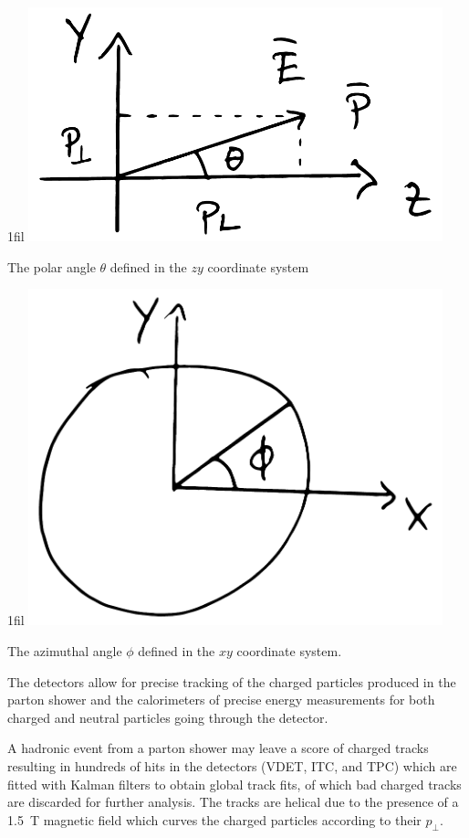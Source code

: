 \documentclass[a4paper, twoside, nobib]{tufte-book}
\makeatletter
\newcommand*{\centerfloat}{%
  \parindent \z@
  \leftskip \z@ \@plus 1fil \@minus \textwidth
  \rightskip\leftskip
  \parfillskip \z@skip}
\makeatother
\begin{document}
\begin{marginfigure}
  \centerfloat
  \includegraphics[width=0.9\textwidth]{figures/yz_coordinate_system/yz_coords.pdf}
  \caption[Polar angle]{The polar angle $\theta$ defined in the $zy$ coordinate system}
  \label{fig:hep:aleph_detector_theta}
\end{marginfigure}
\begin{marginfigure}
  \centerfloat
  \includegraphics[width=0.9\textwidth]{figures/xy_coordinate_system/xy_coords.pdf}
  \caption[Azimuthal angle]{The azimuthal angle $\phi$ defined in the $xy$ coordinate system. }
  \label{fig:hep:aleph_detector_phi}
\end{marginfigure}

The detectors allow for precise tracking of the charged particles produced in the parton shower and the calorimeters of precise energy measurements for both charged and neutral particles going through the detector.

A hadronic event from a parton shower may leave a score of charged tracks resulting in hundreds of hits in the detectors (VDET, ITC, and TPC) which are fitted with Kalman filters to obtain global track fits, of which bad charged tracks are discarded for further analysis. The tracks are helical due to the presence of a \SI{1.5}{T} magnetic field which curves the charged particles according to their $p_\perp$.
\end{document}
